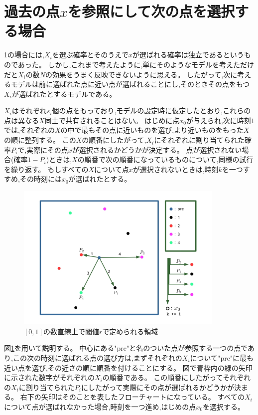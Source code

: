 \section{過去の点$x$を参照にして次の点を選択する場合}

1の場合には,$X_{i}$を選ぶ確率とそのうえで$x$が選ばれる確率は独立であるというものであった。
しかし,これまで考えたように,単にそのようなモデルを考えただけだと$X_{i}$の数$N$の効果をうまく反映できないように思える。
したがって,次に考えるモデルは前に選ばれた点に近い点が選ばれることにし,そのときその点をもつ$X_{i}$が選ばれたとするモデルである。


$X_{i}$はそれぞれ$s_{i}$個の点をもっており,モデルの設定時に仮定したとおり,これらの点は異なる$X$同士で共有されることはない。
はじめに点$x_{0}$が与えられ,次に時刻$1$では,それぞれの$X$の中で最もその点に近いものを選び,より近いものをもった$X$の順に整列する。
この$X$の順番にしたがって,$X_{i}$にそれぞれに割り当てられた確率$P_{i}$で,実際にその点$x$が選択されるかどうかが決定する。
点が選択されない場合(確率$1-P_{i}$)ときは,$X$の順番で次の順番になっているものについて,同様の試行を繰り返す。
もしすべての$X$について点$x$が選択されないときは,時刻$k$を一つすすめ,その時刻には$x_{0}$が選ばれたとする。

\begin{figure}[H]
    \begin{center}
        \includegraphics[width=10cm]{../img/figure2.jpg}
        \caption{$[0,1]$の数直線上で閾値$r$で定められる領域}
        \label{fig:f8}
    \end{center}
\end{figure}

図\ref{fig:f8}を用いて説明する。
中心にある"pre"と名のついた点が参照する一つの点であり,この次の時刻に選ばれる点の選び方は,まずそれぞれの$X_{i}$について"pre"に最も近い点を選び,その近さの順に順番を付けることにする。
図で青枠内の緑の矢印に示された数字がそれぞれの$X_{i}$の順番である。
この順番にしたがってそれぞれの$X_{i}$に割り当てられた$P_{i}$にしたがって実際にその点が選ばれるかどうかが決まる。
右下の矢印はそのことを表したフローチャートになっている。
すべての$X_{i}$について点が選ばれなかった場合,時刻を一つ進め,はじめの点$x_{0}$を選択する。


